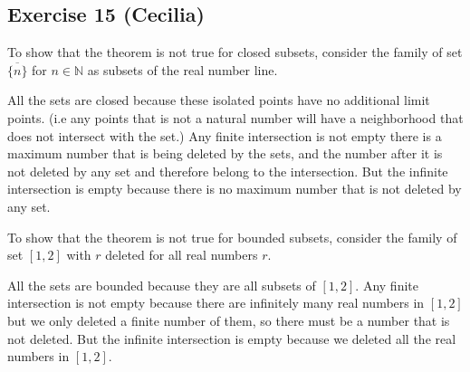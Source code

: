 \subsection*{Exercise 15 (Cecilia)}
To show that the theorem is not true for closed subsets, consider the family of set $ \overline{\{n\}} $ for $ n \in \mathbb{N} $ as subsets of the real number line.

All the sets are closed because these isolated points have no additional limit points. (i.e any points that is not a natural number will have a neighborhood that does not intersect with the set.)
Any finite intersection is not empty there is a maximum number that is being deleted by the sets, and the number after it is not deleted by any set and therefore belong to the intersection.
But the infinite intersection is empty because there is no maximum number that is not deleted by any set.

To show that the theorem is not true for bounded subsets, consider the family of set $ [1, 2] $ with $ r $ deleted for all real numbers $ r $.

All the sets are bounded because they are all subsets of $ [1, 2] $.
Any finite intersection is not empty because there are infinitely many real numbers in $ [1, 2] $ but we only deleted a finite number of them, so there must be a number that is not deleted.
But the infinite intersection is empty because we deleted all the real numbers in $ [1, 2] $.

